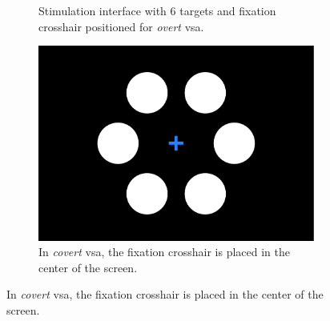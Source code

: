 \documentclass{article}
\begin{document}
\begin{figure}
\begin{minipage}[b]{.54\textwidth}
\begin{subfigure}[b]{.45\linewidth}
			\caption{Stimulation interface with 6 targets and fixation crosshair
				positioned for \emph{overt} \ac{vsa}.}
		\end{subfigure}\hfill%
		\begin{subfigure}[b]{.45\linewidth}
			\includegraphics[width=\textwidth]{figures/stim_covert.pdf}
			\caption{In \emph{covert} \ac{vsa}, the fixation crosshair is placed in the
				center of the screen.}
		\end{subfigure}
		\smallskip


\end{minipage}
\end{figure}
\end{document}
